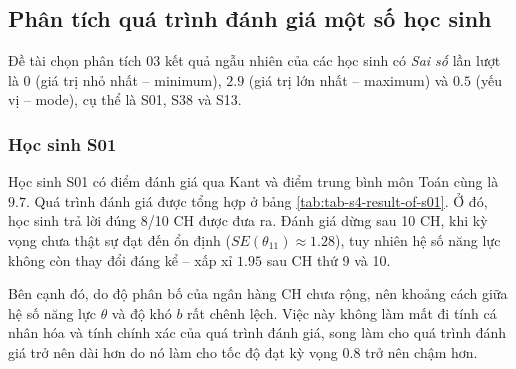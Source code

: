 \subsection{Phân tích quá trình đánh giá một số học sinh}

Đề tài chọn phân tích 03 kết quả ngẫu nhiên của các học sinh có \textit{Sai số} lần lượt là $0$ (giá trị nhỏ nhất – minimum), $2.9$ (giá trị lớn nhất – maximum) và $0.5$ (yếu vị – mode), cụ thể là S01, S38 và S13.\par

\subsubsection{Học sinh S01}

Học sinh S01 có điểm đánh giá qua Kant và điểm trung bình môn Toán cùng là $9.7$. Quá trình đánh giá được tổng hợp ở bảng \ref{tab:tab-s4-result-of-s01}. Ở đó, học sinh trả lời đúng 8/10 CH được đưa ra. Đánh giá dừng sau 10 CH, khi kỳ vọng chưa thật sự đạt đến ổn định ($SE(\theta_{11})\approx 1.28$), tuy nhiên hệ số năng lực không còn thay đổi đáng kể – xấp xỉ $1.95$ sau CH thứ 9 và 10.\par

Bên cạnh đó, do độ phân bố của ngân hàng CH chưa rộng, nên khoảng cách giữa hệ số năng lực $\theta$ và độ khó $b$ rất chênh lệch. Việc này không làm mất đi tính cá nhân hóa và tính chính xác của quá trình đánh giá, song làm cho quá trình đánh giá trở nên dài hơn do nó làm cho tốc độ đạt kỳ vọng $0.8$ trở nên chậm hơn.\par

